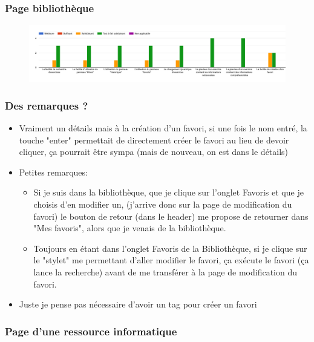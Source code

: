 \subsubsection*{Page bibliothèque}

\begin{figure}[H]
    \includegraphics[width=\textwidth,height=0.3\textheight,keepaspectratio]{images/googleForm/bibliotheque_1.png}
    \centering
\end{figure}

\subsubsection*{Des remarques ?}

\begin{itemize}
    \item Vraiment un détails mais à la création d'un favori, si une fois le nom entré, la touche "enter" permettait de directement créer le favori au lieu de devoir cliquer, ça pourrait être sympa (mais de nouveau, on est dans le détails)
    \item Petites remarques:
    \begin{itemize}
        \item Si je suis dans la bibliothèque, que je clique sur l'onglet Favoris et que je choisis d'en modifier un, (j'arrive donc sur la page de modification du favori) le bouton de retour (dans le header) me propose de retourner dans "Mes favoris", alors que je venais de la bibliothèque.
        \item Toujours en étant dans l'onglet Favoris de la Bibliothèque, si je clique sur le "stylet" me permettant d'aller modifier le favori, ça exécute le favori (ça lance la recherche) avant de me transférer à la page de modification du favori.
    \end{itemize} 
    \item Juste je pense pas nécessaire d'avoir un tag pour créer un favori
\end{itemize}

\subsubsection*{Page d'une ressource informatique}

